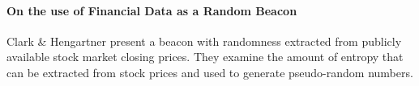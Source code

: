 \paragraph{On the use of Financial Data as a Random Beacon}
Clark & Hengartner \cite{clark2010use} present a beacon with randomness extracted from publicly available stock market closing prices. They examine the amount of entropy that can be extracted from stock prices and used to generate pseudo-random numbers.  